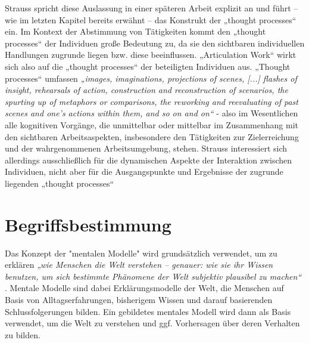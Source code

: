Strauss spricht diese Auslassung in einer späteren Arbeit explizit an \citep[][S. 131]{Strauss93} und führt -- wie im letzten Kapitel bereits erwähnt -- das Konstrukt der „thought processes“ ein. Im Kontext der Abstimmung von Tätigkeiten kommt den „thought processes“ der Individuen große Bedeutung zu, da sie den sichtbaren individuellen Handlungen zugrunde liegen bzw. diese beeinflussen. „Articulation Work“ wirkt sich also auf die „thought processes“ der beteiligten Individuen aus. „Thought processes“ umfassen \emph{„images, imaginations, projections of scenes, [...] flashes of insight, rehearsals of action, construction and reconstruction of scenarios,  the spurting up of metaphors or comparisons, the reworking and reevaluating of past scenes and one's actions within them, and so on and on“} \citep[][S. 130]{Strauss93} - also im Wesentlichen alle kognitiven Vorgänge, die unmittelbar oder mittelbar im Zusammenhang mit den sichtbaren Arbeitsaspekten, insbesondere den Tätigkeiten zur Zielerreichung und der wahrgenommenen Arbeitsumgebung, stehen. Strauss interessiert sich allerdings ausschließlich für die dynamischen Aspekte der Interaktion zwischen Individuen, nicht aber für die Ausgangspunkte und Ergebnisse der zugrunde liegenden „thought processes“ \citep[][S. 149]{Strauss93}


\section{Begriffsbestimmung} %
\label{sec:begriffsbestimmung}


Das Konzept der "mentalen Modelle" wird grundsätzlich verwendet, um zu erklären \emph{„wie Menschen die Welt verstehen -- genauer: wie sie ihr Wissen benutzen, um sich bestimmte Phänomene der Welt subjektiv plausibel zu machen“} \citep[][S. VII]{Seel91}. Mentale Modelle sind dabei Erklärungsmodelle der Welt, die Menschen auf Basis von Alltagserfahrungen, bisherigem Wissen und darauf basierenden Schlussfolgerungen bilden. Ein gebildetes mentales Modell wird dann als Basis verwendet, um die Welt zu verstehen und ggf. Vorhersagen über deren Verhalten zu bilden. \citep[][S. VII]{Seel91}

